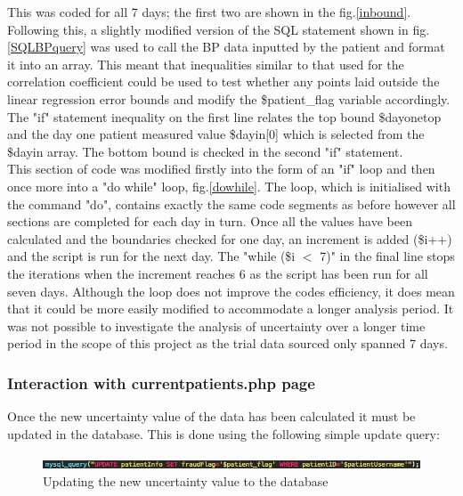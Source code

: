 \documentclass[11pt]{article}
\begin{document}
This was coded for all 7 days; the first two are shown in the fig.\ref{inbound}. Following this, a slightly modified version of the SQL statement shown in fig.\ref{SQLBPquery} was used to call the BP data inputted by the patient and format it into an array. This meant that inequalities similar to that used for the correlation coefficient could be used to test whether any points laid outside the linear regression error bounds and modify the \$patient\_flag variable accordingly. The "if" statement inequality on the first line relates the top bound \$dayonetop and the day one patient measured value \$dayin[0] which is selected from the \$dayin array. The bottom bound is checked in the second "if" statement.
\\ \indent 
This section of code was modified firstly into the form of an "if" loop and then once more into a "do while" loop, fig.\ref{dowhile}. The loop, which is initialised with the command "do", contains exactly the same code segments as before however all sections are completed for each day in turn. Once all the values have been calculated and the boundaries checked for one day, an increment is added (\$i++) and the script is run for the next day. The "while (\$i $<$ 7)" in the final line stops the iterations when the increment reaches 6 as the script has been run for all seven days. Although the loop does not improve the codes efficiency, it does mean that it could be more easily modified to accommodate a longer analysis period. It was not possible to investigate the analysis of uncertainty over a longer time period in the scope of this project as the trial data sourced only spanned 7 days. 
\subsubsection{Interaction with currentpatients.php page}
Once the new uncertainty value of the data has been calculated it must be updated in the database. This is done using the following simple update query:
\begin{figure}[h!] 
\includegraphics[width=\linewidth]{finalupdate.png}
\caption{Updating the new uncertainty value to the database}
\end{figure} 
\end{document}
